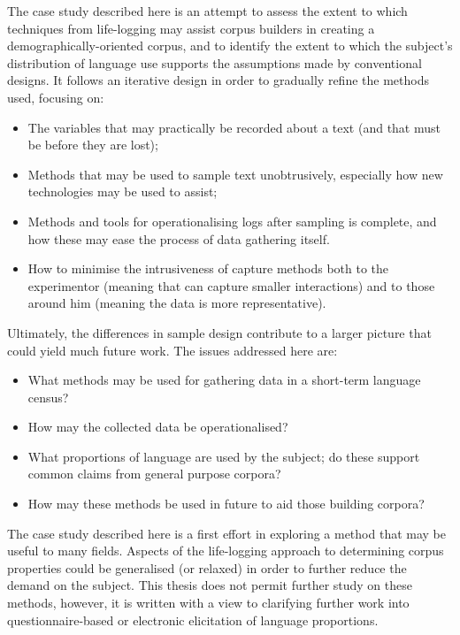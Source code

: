 
The case study described here is an attempt to assess the extent to which techniques from life-logging may assist corpus builders in creating a demographically-oriented corpus, and to identify the extent to which the subject's distribution of language use supports the assumptions made by conventional designs.  It follows an iterative design in order to gradually refine the methods used, focusing on:

\begin{itemize}
    \item The variables that may practically be recorded about a text (and that must be before they are lost);
    \item Methods that may be used to sample text unobtrusively, especially how new technologies may be used to assist;
    \item Methods and tools for operationalising logs after sampling is complete, and how these may ease the process of data gathering itself.
    \item How to minimise the intrusiveness of capture methods both to the experimentor (meaning that can capture smaller interactions) and to those around him (meaning the data is more representative).
\end{itemize}

Ultimately, the differences in sample design contribute to a larger picture that could yield much future work.  The issues addressed here are:

\begin{itemize}
    \item What methods may be used for gathering data in a short-term language census?
    \item How may the collected data be operationalised?
    \item What proportions of language are used by the subject; do these support common claims from general purpose corpora?
    \item How may these methods be used in future to aid those building corpora?
\end{itemize}


The case study described here is a first effort in exploring a method that may be useful to many fields.  Aspects of the life-logging approach to determining corpus properties could be generalised (or relaxed) in order to further reduce the demand on the subject.  This thesis does not permit further study on these methods, however, it is written with a view to clarifying further work into questionnaire-based or electronic elicitation of language proportions.






